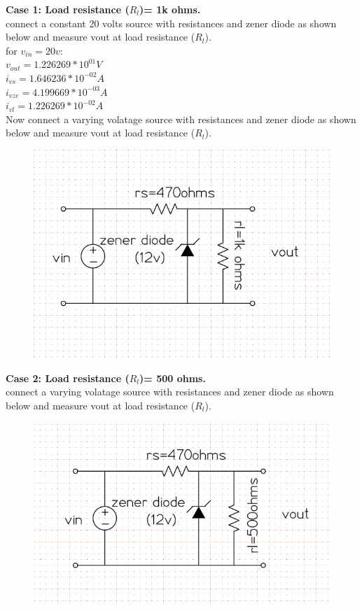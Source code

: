\documentclass[12pt]{article}
\begin{document}
\textbf{Case 1: Load resistance (\(R_{l}\))= 1k ohms.\\}
connect a constant 20 volts source with resistances and zener diode as shown below and measure vout at load resistance (\(R_{l}\)).\\
for \(v_{in}=20v\):\\
\(v_{out}= 1.226269*10^{01} V\)\\
\(i_{vs} = 1.646236*10^{-02} A\)\\
\(i_{vze} = 4.199669*10^{-03} A\)\\
\(i_{vl}= 1.226269*10^{-02} A\)\\
Now connect a varying volatage source with resistances and zener diode as shown below and measure vout at load resistance (\(R_{l}\)).
 \begin{figure}[h!]
\centering
\includegraphics[scale = 0.4]{zener_1k_cir.png}
\end{figure}
\textbf{Case 2: Load resistance (\(R_{l}\))= 500 ohms.\\}
connect a varying volatage source with resistances and zener diode as shown below and measure vout at load resistance (\(R_{l}\)).
 \begin{figure}[h!]
\centering
\includegraphics[scale = 0.4]{zener_500_cir.png}
\end{figure}
\newpage
\end{document}

